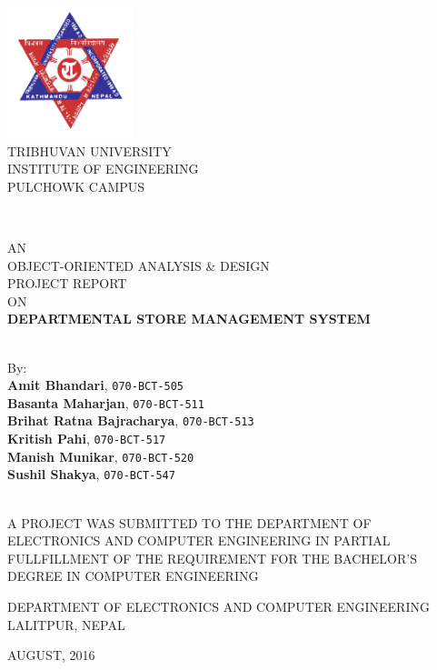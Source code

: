 

\thispagestyle{empty} %

\begin{center}
  \includegraphics[height=1.5in]{fig/tu}\\
  TRIBHUVAN UNIVERSITY\\
  INSTITUTE OF ENGINEERING\\
  PULCHOWK CAMPUS

  ~

  AN\\
  OBJECT-ORIENTED ANALYSIS \& DESIGN\\
  PROJECT REPORT\\
  ON\\[10pt]
  {\bf\Large DEPARTMENTAL STORE MANAGEMENT SYSTEM}\\

  ~

  By:\\
  {\bf Amit Bhandari}, {\tt 070-BCT-505}\\
  {\bf Basanta Maharjan}, {\tt 070-BCT-511}\\
  {\bf Brihat Ratna Bajracharya}, {\tt 070-BCT-513}\\
  {\bf Kritish Pahi}, {\tt 070-BCT-517}\\
  {\bf Manish Munikar}, {\tt 070-BCT-520}\\
  {\bf Sushil Shakya}, {\tt 070-BCT-547}\\

  ~

  \small
  A PROJECT WAS SUBMITTED TO THE DEPARTMENT OF ELECTRONICS
  AND COMPUTER ENGINEERING IN PARTIAL FULLFILLMENT OF THE
  REQUIREMENT FOR THE BACHELOR'S DEGREE IN COMPUTER ENGINEERING


  DEPARTMENT OF ELECTRONICS AND COMPUTER ENGINEERING\\
  LALITPUR, NEPAL

  \vfill
  \normalsize
  AUGUST, 2016

\end{center}

